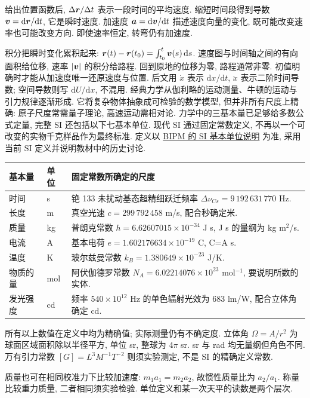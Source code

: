 给出位置函数后, $\Delta\boldsymbol{r}/\Delta t$ 表示一段时间的平均速度. 缩短时间段得到导数 $\boldsymbol{v}=\mathrm d\boldsymbol{r}/\mathrm dt$, 它是瞬时速度. 加速度 $\boldsymbol{a}=\mathrm d\boldsymbol{v}/\mathrm dt$ 描述速度向量的变化, 既可能改变速率也可能改变方向. 即使速率恒定, 转弯仍有加速度.

积分把瞬时变化累积起来: $\boldsymbol{r}(t)-\boldsymbol{r}(t_0)=\int_{t_0}^t\boldsymbol{v}(s)\,\mathrm d s$. 速度图与时间轴之间的有向面积给位移, 速率 $|\boldsymbol{v}|$ 的积分给路程. 回到原地的位移为零, 路程通常非零. 初值明确时才能从加速度唯一还原速度与位置. 后文用 $\dot x$ 表示 $\mathrm dx/\mathrm dt$, $\ddot x$ 表示二阶时间导数; 空间导数则写 $\mathrm dU/\mathrm dx$, 不混用.
经典力学从伽利略的运动测量、牛顿的运动与引力规律逐渐形成. 它将复杂物体抽象成可检验的数学模型, 但并非所有尺度上精确: 原子尺度常需量子理论, 高速运动需相对论. 力学中的三基本量已足够给多数公式定量, 完整 SI 还包括以下七基本单位. 现代 SI 通过固定常数定义, 不再以一个可改变的实物千克样品作为最终标准. 定义以 \href{https://www.bipm.org/en/measurement-units/si-base-units}{BIPM 的 SI 基本单位说明} 为准, 采用当前 SI 定义并说明教材中的历史讨论.
\begin{longtable}{@{}p{}p{}p{}@{}}
\toprule 基本量 & 单位 & 固定常数所确定的尺度 \\\midrule
时间 & s & 铯 133 未扰动基态超精细跃迁频率 $\Delta\nu_{Cs}=9\,192\,631\,770$ Hz. \\
长度 & m & 真空光速 $c=299\,792\,458$ m/s, 配合秒确定米. \\
质量 & kg & 普朗克常数 $h=6.62607015\times10^{-34}$ J s, J s 的量纲为 kg m$^2$/s. \\
电流 & A & 基本电荷 $e=1.602176634\times10^{-19}$ C, C=A s. \\
温度 & K & 玻尔兹曼常数 $k_B=1.380649\times10^{-23}$ J/K. \\
物质的量 & mol & 阿伏伽德罗常数 $N_A=6.02214076\times10^{23}$ mol$^{-1}$, 要说明所数的实体. \\
发光强度 & cd & 频率 $540\times10^{12}$ Hz 的单色辐射光效为 683 lm/W, 配合立体角确定 cd. \\\bottomrule
\end{longtable}
所有以上数值在定义中均为精确值; 实际测量仍有不确定度. 立体角 $\Omega=A/r^2$ 为球面区域面积除以半径平方, 单位 sr, 整球为 $4\pi$ sr. sr 与 rad 均无量纲但角色不同. 万有引力常数 $[G]=L^3M^{-1}T^{-2}$ 则须实验测定, 不是 SI 的精确定义常数.

质量也可在相同校准力下比较加速度: $m_1a_1=m_2a_2$, 故惯性质量比为 $a_2/a_1$. 称量比较重力质量, 二者相同须实验检验. 单位定义和某一次天平的读数是两个层次.

